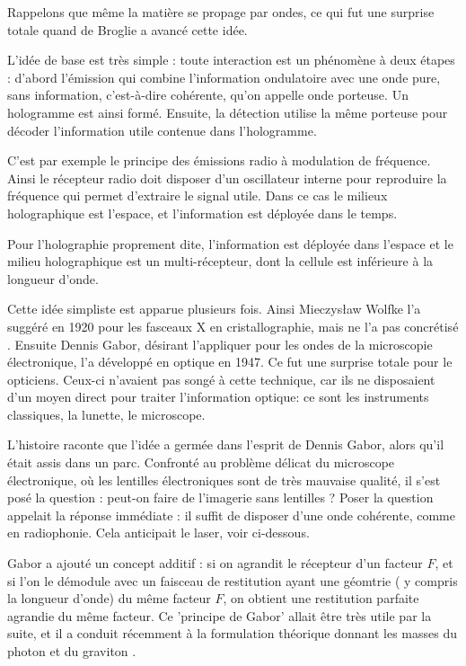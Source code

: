 \documentclass[a4paper,12pt]{article}
\begin{document}
Rappelons que même la matière se propage par ondes, ce qui fut une surprise totale quand de Broglie a avancé cette idée. 



L'idée de base est très simple : toute interaction est un phénomène à deux étapes : d'abord l'émission qui combine l'information ondulatoire avec une onde pure, sans information, c'est-à-dire cohérente, qu'on appelle onde porteuse. Un hologramme est ainsi formé. Ensuite, la détection utilise la même porteuse pour décoder l'information utile contenue dans l'hologramme.


C'est par exemple le principe des émissions radio à modulation de fréquence. Ainsi le récepteur radio doit disposer d'un oscillateur interne pour reproduire la fréquence qui permet d'extraire le signal utile. Dans ce cas le milieux holographique est l'espace, et l'information est déployée dans le temps.


Pour l'holographie proprement dite, l'information est déployée dans l'espace et le milieu holographique est un multi-récepteur, dont la cellule est inférieure à la longueur d'onde.


Cette idée simpliste est apparue plusieurs fois. Ainsi Mieczysław Wolfke l'a suggéré en 1920 pour les fasceaux X en cristallographie, mais ne l'a pas concrétisé \cite{Gabor}. Ensuite Dennis Gabor, désirant l'appliquer pour les ondes de la microscopie électronique, l'a développé en optique en 1947. Ce fut une surprise totale pour le opticiens. Ceux-ci n'avaient pas songé à cette technique, car ils ne disposaient d'un moyen direct pour traiter l'information optique: ce sont les instruments classiques, la lunette, le microscope.



L'histoire raconte que l'idée a germée dans l'esprit de Dennis Gabor, alors qu'il était assis dans un parc. Confronté au problème délicat du microscope électronique, où les lentilles électroniques sont de très mauvaise qualité, il s'est posé la question : peut-on faire de l'imagerie sans lentilles ? Poser la question appelait la réponse immédiate : il suffit de disposer d'une onde cohérente, comme en radiophonie. Cela anticipait le laser, voir ci-dessous.


Gabor a ajouté un concept additif : si on agrandit le récepteur d'un facteur $F$, et si l'on le démodule avec un faisceau de restitution ayant une géomtrie ( y compris la longueur d'onde) du même facteur $F$, on obtient une restitution parfaite agrandie du même facteur. Ce 'principe de Gabor' allait être très utile par la suite, et il a conduit récemment à la formulation théorique donnant les masses du photon et du graviton \cite{Sanchez}.
\end{document}
